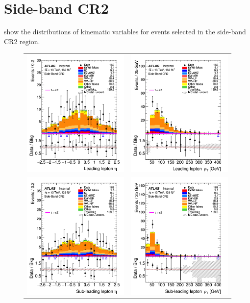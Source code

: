\clearpage
\FloatBarrier
\section{Side-band CR2}
\label{app:CRs:SB2}
 show the distributions 
of kinematic variables for events selected in the side-band CR2 region.

\begin{figure}[!htbp]
	\centering
	\begin{tabular}{cc}
		\includegraphics[width=.32\textwidth]{Appendices/AP6/figures/SBCR2/lep1_eta} &
		\includegraphics[width=.32\textwidth]{Appendices/AP6/figures/SBCR2/lep1_pt} \\
		\includegraphics[width=.32\textwidth]{Appendices/AP6/figures/SBCR2/lep2_eta} &
		\includegraphics[width=.32\textwidth]{Appendices/AP6/figures/SBCR2/lep2_pt} \\

\end{tabular}
\end{figure}
